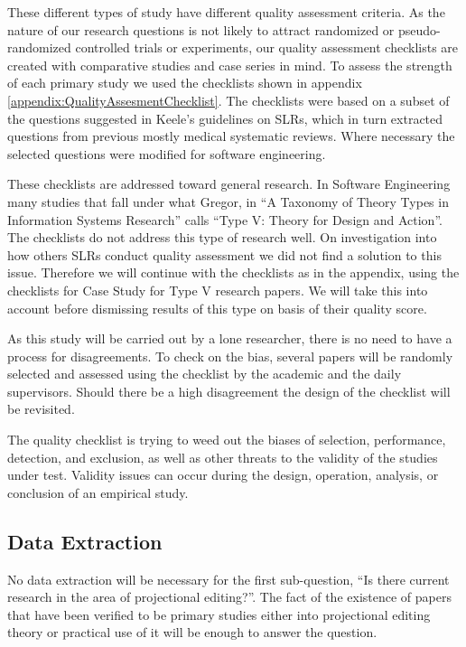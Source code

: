 These different types of study have different quality assessment criteria.
As the nature of our research questions is not likely to attract randomized or pseudo-randomized controlled trials or experiments, our quality assessment checklists are created with comparative studies and case series in mind.
To assess the strength of each primary study we used the checklists shown in appendix \ref{appendix:QualityAssesmentChecklist}.
The checklists were based on a subset of the questions suggested in Keele's guidelines on SLRs\cite{keele2007guidelines}, which in turn extracted questions from previous mostly medical systematic reviews.
Where necessary the selected questions were modified for software engineering.

These checklists are addressed toward general research.
In Software Engineering many studies that fall under what Gregor\cite{gregor2006nature}, in ``A Taxonomy of Theory Types in Information Systems Research'' calls ``Type V: Theory for Design and Action''.
The checklists do not address this type of research well.
On investigation into how others SLRs conduct quality assessment we did not find a solution to this issue.
Therefore we will continue with the checklists as in the appendix, using the checklists for Case Study for Type V research papers.
We will take this into account before dismissing results of this type on basis of their quality score.

As this study will be carried out by a lone researcher, there is no need to have a process for disagreements.
To check on the bias, several papers will be randomly selected and assessed using the checklist by the academic and the daily supervisors.
Should there be a high disagreement the design of the checklist will be revisited.

The quality checklist is trying to weed out the biases of selection, performance, detection, and exclusion, as well as other threats to the validity of the studies under test.
Validity issues can occur during the design, operation, analysis, or conclusion of an empirical study.

\subsection{Data Extraction}
\label{section:dataExtraction}
No data extraction will be necessary for the first sub-question,  ``Is there current research in the area of projectional editing?''.
The fact of the existence of papers that have been verified to be primary studies either into projectional editing theory or practical use of it will be enough to answer the question.

